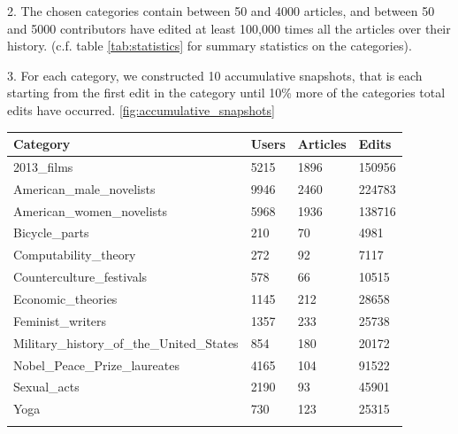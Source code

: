 \documentclass{acm_proc_article-sp}
\begin{document}
2. The chosen categories contain between 50 and 4000 articles, and between 50 and 5000 contributors have edited at least 100,000 times all the articles over their history. (c.f. table \ref{tab:statistics} for summary statistics on the categories). 

3. For each category, we constructed 10 accumulative snapshots, that is each starting from the first edit in the category until 10\% more of the categories total edits have occurred. \ref{fig:accumulative_snapshots}

\begin{tabular}{llll}
\toprule
Category & Users & Articles &  Edits \\
\midrule
2013\_films &  5215 &     1896 &  150956 \\
American\_male\_novelists &  9946 &     2460 &  224783 \\
American\_women\_novelists &  5968 &     1936 &  138716 \\
Bicycle\_parts &   210 &       70 &    4981 \\
Computability\_theory &   272 &       92 &    7117 \\
Counterculture\_festivals &   578 &       66 &   10515 \\
Economic\_theories &  1145 &      212 &   28658 \\
Feminist\_writers &  1357 &      233 &   25738 \\
Military\_history\_of\_the\_United\_States &   854 &      180 &   20172 \\
Nobel\_Peace\_Prize\_laureates &  4165 &      104 &   91522 \\
Sexual\_acts &  2190 &       93 &   45901 \\
Yoga &   730 &      123 &   25315 \\
\bottomrule
\label{tab:statistics}
\end{tabular}
\end{document}
